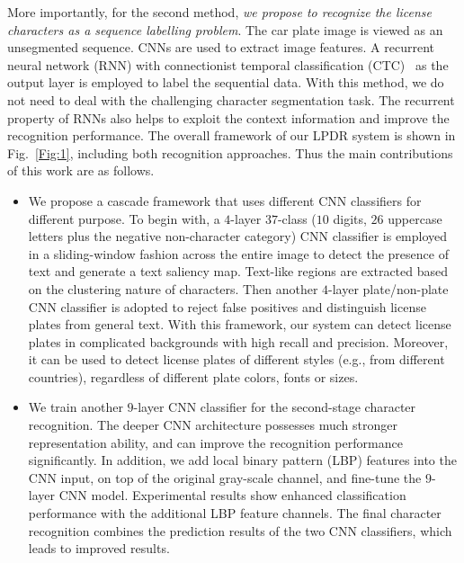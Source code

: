 \documentclass[twocolumn]{svjour3}
\begin{document}
More importantly, for the second method, {\em
we propose to recognize the license characters as a sequence labelling problem}.
The car  plate image is viewed as an unsegmented sequence.
CNNs are used to extract  image features. A recurrent neural
network (RNN) with connectionist temporal classification
(CTC)~\cite{Graves2009Pami} as the output layer is employed to label the
sequential data. With this method, we do not need to deal with the challenging
character segmentation task. The recurrent property of RNNs also
helps to exploit the context information and improve the recognition
performance. The overall framework of our LPDR system is shown in
Fig.~\ref{Fig:1}, including both recognition approaches.
Thus the main contributions of this work are as follows.

\begin{itemize}
  \item 

  We propose a cascade framework that uses different CNN classifiers for
  different purpose. To begin with, a $4$-layer $37$-class ($10$ digits, $26$ uppercase letters plus the negative non-character category) CNN classifier is employed in a sliding-window fashion across the entire image to detect
  the presence of text and generate a text saliency map.  Text-like regions are
  extracted based on the clustering nature of characters. Then another
  $4$-layer plate/non-plate CNN classifier is adopted to reject false positives
  and distinguish license plates from general text. With this framework, our
  system can detect license plates in complicated backgrounds with high recall
  and precision. Moreover, it can be used to detect license plates of different styles (e.g., from different
  countries), regardless of different plate colors, fonts or sizes.

\item 


  We train another $9$-layer CNN classifier for the second-stage character recognition.
  The deeper CNN architecture possesses much stronger representation ability,
  and can improve the recognition performance significantly. In addition, we
add local binary pattern (LBP) features into the CNN input, on top of the original gray-scale channel,
and fine-tune the $9$-layer CNN model.  Experimental results show enhanced classification performance with the additional LBP feature channels.
The final character recognition combines the prediction results of the two CNN classifiers, which leads to improved results.




\end{itemize}
\end{document}

